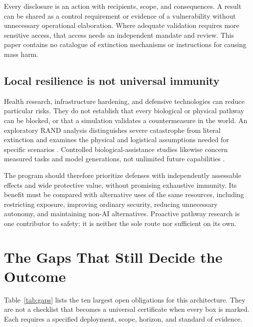 \documentclass[10pt,twocolumn,letterpaper]{article}
\begin{document}
Every disclosure is an action with recipients, scope, and consequences. A result can be shared as a control requirement or evidence of a vulnerability without unnecessary operational elaboration. Where adequate validation requires more sensitive access, that access needs an independent mandate and review. This paper contains no catalogue of extinction mechanisms or instructions for causing mass harm.

\subsection{Local resilience is not universal immunity}
Health research, infrastructure hardening, and defensive technologies can reduce particular risks. They do not establish that every biological or physical pathway can be blocked, or that a simulation validates a countermeasure in the world. An exploratory RAND analysis distinguishes severe catastrophe from literal extinction and examines the physical and logistical assumptions needed for specific scenarios \cite{randextinction}. Controlled biological-assistance studies likewise concern measured tasks and model generations, not unlimited future capabilities \cite{labtrial}.

The program should therefore prioritize defenses with independently assessable effects and wide protective value, without promising exhaustive immunity. Its benefit must be compared with alternative uses of the same resources, including restricting exposure, improving ordinary security, reducing unnecessary autonomy, and maintaining non-AI alternatives. Proactive pathway research is one contributor to safety; it is neither the sole route nor sufficient on its own.

\section{The Gaps That Still Decide the Outcome}
\label{sec:gaps}
Table~\ref{tab:gaps} lists the ten largest open obligations for this architecture. They are not a checklist that becomes a universal certificate when every box is marked. Each requires a specified deployment, scope, horizon, and standard of evidence.
\end{document}
